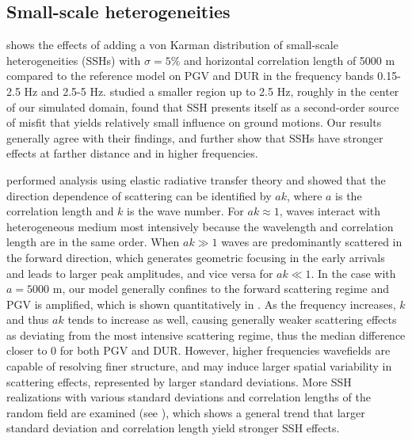 
\subsection{Small-scale heterogeneities}
 shows the effects of adding a von Karman distribution of small-scale heterogeneities (SSHs) with $\sigma = 5\%$ and horizontal correlation length of 5000 m compared to the reference model on PGV and DUR in the frequency bands 0.15-2.5 Hz and 2.5-5 Hz. \citet{savranGroundMotionSimulation2019} studied a smaller region up to 2.5 Hz, roughly in the center of our simulated domain, found that SSH presents itself as a second-order source of misfit that yields relatively small influence on ground motions. Our results generally agree with their findings, and further show that SSHs have stronger effects at farther distance and in higher frequencies.

\citet{przybillaEstimationCrustalScattering2009} performed analysis using elastic radiative transfer theory and showed that the direction dependence of scattering can be identified by $ak$, where $a$ is the correlation length and $k$ is the wave number. For $ak \approx 1$, waves interact with heterogeneous medium most intensively because the wavelength and correlation length are in the same order. When $ak\gg 1$ waves are predominantly scattered in the forward direction, which generates geometric focusing in the early arrivals and leads to larger peak amplitudes, and vice versa for $ak \ll 1$. In the case with $a=5000$ m, our model generally confines to the forward scattering regime and PGV is amplified, which is shown quantitatively in . As the frequency increases, $k$ and thus $ak$ tends to increase as well, causing generally weaker scattering effects as deviating from the most intensive scattering regime, thus the median difference closer to 0 for both PGV and DUR. However, higher frequencies wavefields are capable of resolving finer structure, and may induce larger spatial variability in scattering effects, represented by larger standard deviations. More SSH realizations with various standard deviations and correlation lengths of the random field are examined (see ), which shows a general trend that larger standard deviation and correlation length yield stronger SSH effects.


